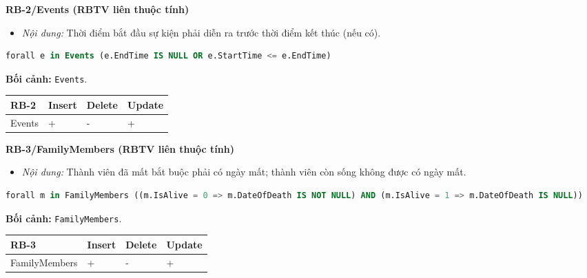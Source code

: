 \vspace{1.0em}
\textbf{RB-2/Events (RBTV liên thuộc tính)}
\begin{itemize}
	\item \emph{Nội dung:} Thời điểm bắt đầu sự kiện phải diễn ra trước thời điểm kết thúc (nếu có).
\end{itemize}

\begin{lstlisting}[language=SQL]
	forall e in Events (e.EndTime IS NULL OR e.StartTime <= e.EndTime)
\end{lstlisting}
\noindent\textbf{Bối cảnh:} \texttt{Events}.

\vspace{0.4em}
{\centering
	\renewcommand{\arraystretch}{1.2}
	\begin{tabular}{|>{\raggedright\arraybackslash}p{}|>{\centering\arraybackslash}p{}|>{\centering\arraybackslash}p{}|>{\centering\arraybackslash}p{}|}
		\hline
		\textbf{RB-2} & \textbf{Insert} & \textbf{Delete} & \textbf{Update} \\ \hline
		Events & + & - & + \\ \hline
	\end{tabular}\par}

\vspace{1.0em}
\textbf{RB-3/FamilyMembers (RBTV liên thuộc tính)}
\begin{itemize}
	\item \emph{Nội dung:} Thành viên đã mất bắt buộc phải có ngày mất; thành viên còn sống không được có ngày mất.
\end{itemize}

\begin{lstlisting}[language=SQL]
	forall m in FamilyMembers ((m.IsAlive = 0 => m.DateOfDeath IS NOT NULL) AND (m.IsAlive = 1 => m.DateOfDeath IS NULL))
\end{lstlisting}
\noindent\textbf{Bối cảnh:} \texttt{FamilyMembers}.

\vspace{0.4em}
{\centering
	\renewcommand{\arraystretch}{1.2}
	\begin{tabular}{|>{\raggedright\arraybackslash}p{}|>{\centering\arraybackslash}p{}|>{\centering\arraybackslash}p{}|>{\centering\arraybackslash}p{}|}
		\hline
		\textbf{RB-3} & \textbf{Insert} & \textbf{Delete} & \textbf{Update} \\ \hline
		FamilyMembers & + & - & + \\ \hline
	\end{tabular}\par}

